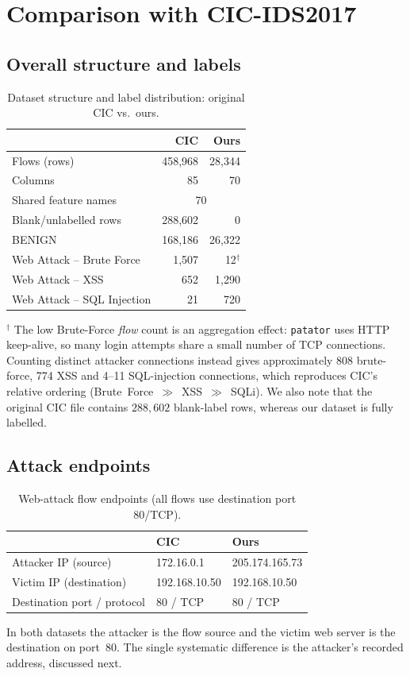 \documentclass[11pt]{article}
\begin{document}
\section{Comparison with CIC-IDS2017}

\subsection{Overall structure and labels}
\begin{table}[h]
\centering
\caption{Dataset structure and label distribution: original CIC vs.\ ours.}
\label{tab:labels}
\begin{tabular}{@{}lrr@{}}
\toprule
 & CIC & Ours \\
\midrule
Flows (rows)                 & 458{,}968 & 28{,}344 \\
Columns                      & 85 & 70 \\
Shared feature names         & \multicolumn{2}{c}{70} \\
Blank/unlabelled rows        & 288{,}602 & 0 \\
\midrule
BENIGN                       & 168{,}186 & 26{,}322 \\
Web Attack -- Brute Force    & 1{,}507   & 12$^{\dagger}$ \\
Web Attack -- XSS            & 652       & 1{,}290 \\
Web Attack -- SQL Injection  & 21        & 720 \\
\bottomrule
\end{tabular}
\end{table}
\noindent$^{\dagger}$ The low Brute-Force \emph{flow} count is an aggregation
effect: \texttt{patator} uses HTTP keep-alive, so many login attempts share a
small number of TCP connections. Counting distinct attacker connections instead
gives approximately 808 brute-force, 774 XSS and 4--11 SQL-injection connections,
which reproduces CIC's relative ordering (Brute~Force~$\gg$~XSS~$\gg$~SQLi). We
also note that the original CIC file contains $288{,}602$ blank-label rows,
whereas our dataset is fully labelled.

\subsection{Attack endpoints}
\begin{table}[h]
\centering
\caption{Web-attack flow endpoints (all flows use destination port 80/TCP).}
\label{tab:endpoints}
\begin{tabular}{@{}lll@{}}
\toprule
 & CIC & Ours \\
\midrule
Attacker IP (source) & 172.16.0.1 & 205.174.165.73 \\
Victim IP (destination) & 192.168.10.50 & 192.168.10.50 \\
Destination port / protocol & 80 / TCP & 80 / TCP \\
\bottomrule
\end{tabular}
\end{table}
In both datasets the attacker is the flow source and the victim web server is the
destination on port~80. The single systematic difference is the attacker's
recorded address, discussed next.
\end{document}
